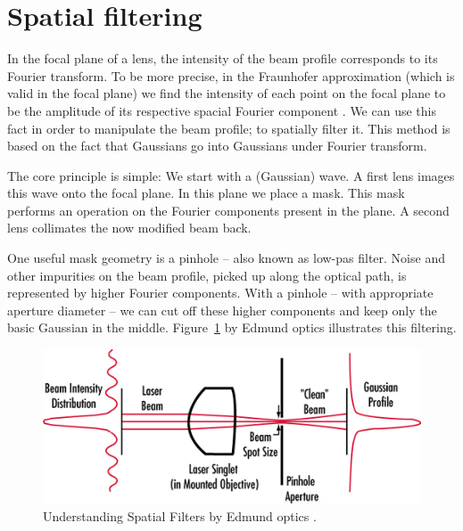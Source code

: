 \section{Spatial filtering}
\label{app:spatial}

In the focal plane of a lens,
the intensity of the beam profile corresponds
to its Fourier transform.
To be more precise,
in the Fraunhofer approximation
(which is valid in the focal plane)
we find the intensity of each point on the focal plane
to be the amplitude of its respective
spacial Fourier component \cite{QE}.
We can use this fact
in order to manipulate the beam profile;
to spatially filter it.
This method is based on the fact that
Gaussians go into Gaussians under Fourier transform.

The core principle is simple:
We start with a (Gaussian) wave.
A first lens images this wave
onto the focal plane.
In this plane we place a mask.
This mask performs an operation
on the Fourier components present in the plane.
A second lens collimates the now modified beam back.

One useful mask geometry is a pinhole --
also known as low-pas filter.
Noise and other impurities on the beam profile,
picked up along the optical path,
is represented by higher Fourier components.
With a pinhole --
with appropriate aperture diameter --
we can cut off these higher components
and keep only the basic Gaussian in the middle.
Figure~\ref{img:spatialfiltering} by Edmund optics
illustrates this filtering.

\begin{figure}
\centering
\includegraphics[width=12.5cm]{img/appendix/spatialfiltering.png}
\caption{Understanding Spatial Filters by Edmund optics \cite{Edmund}.}
\label{img:spatialfiltering}
\end{figure}

